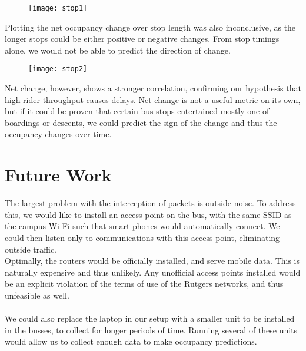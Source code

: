 \documentclass[letterpaper,english]{scrartcl}
\begin{document}
\begin{figure}[H]
\texttt{[image: stop1]}
\centering
\end{figure}

Plotting the net occupancy change over stop length was also inconclusive, as the longer stops could be either positive or negative changes.
From stop timings alone, we would not be able to predict the direction of change.

\begin{figure}[H]
\texttt{[image: stop2]}
\centering
\end{figure}

Net change, however, shows a stronger correlation, confirming our hypothesis that high rider throughput causes delays.
Net change is not a useful metric on its own, but if it could be proven that certain bus stops entertained mostly one of boardings or descents, we could predict the sign of the change and thus the occupancy changes over time.

%




\section*{Future Work}
The largest problem with the interception of packets is outside noise.
To address this, we would like to install an access point on the bus, with the same SSID as the campus Wi-Fi such that smart phones would automatically connect.
We could then listen only to communications with this access point, eliminating outside traffic.
\\
Optimally, the routers would be officially installed, and serve mobile data. This is naturally expensive and thus unlikely. Any unofficial access points installed would be an explicit violation of the terms of use of the Rutgers networks, and thus unfeasible as well.
\\
\\
We could also replace the laptop in our setup with a smaller unit to be installed in the busses, to collect for longer periods of time. Running several of these units would allow us to collect enough data to make occupancy predictions.
\end{document}
